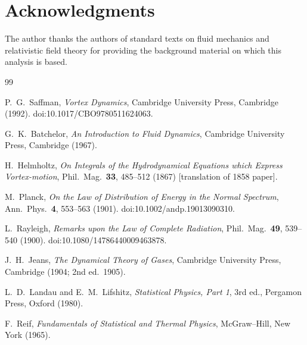 \documentclass[11pt]{article}
\begin{document}
    \section*{Acknowledgments}
        The author thanks the authors of standard texts on fluid mechanics and relativistic field theory for providing the background material on which this analysis is based.

        
        \begin{thebibliography}{99}

            P.~G.~Saffman,
            \newblock \emph{Vortex Dynamics},
            \newblock Cambridge University Press, Cambridge (1992).
            \newblock doi:10.1017/CBO9780511624063.

            G.~K.~Batchelor,
            \newblock \emph{An Introduction to Fluid Dynamics},
            \newblock Cambridge University Press, Cambridge (1967).

            H.~Helmholtz,
            \newblock \emph{On Integrals of the Hydrodynamical Equations which Express Vortex-motion},
            \newblock Phil.\ Mag.\ \textbf{33}, 485--512 (1867) [translation of 1858 paper].

            M.~Planck,
            \newblock \emph{On the Law of Distribution of Energy in the Normal Spectrum},
            \newblock Ann.\ Phys.\ \textbf{4}, 553--563 (1901).
            \newblock doi:10.1002/andp.19013090310.

            L.~Rayleigh,
            \newblock \emph{Remarks upon the Law of Complete Radiation},
            \newblock Phil.\ Mag.\ \textbf{49}, 539--540 (1900).
            \newblock doi:10.1080/14786440009463878.

            J.~H.~Jeans,
            \newblock \emph{The Dynamical Theory of Gases},
            \newblock Cambridge University Press, Cambridge (1904; 2nd ed.\ 1905).

            L.~D.~Landau and E.~M.~Lifshitz,
            \newblock \emph{Statistical Physics, Part 1},
            \newblock 3rd ed., Pergamon Press, Oxford (1980).

            F.~Reif,
            \newblock \emph{Fundamentals of Statistical and Thermal Physics},
            \newblock McGraw--Hill, New York (1965).


\end{thebibliography}
\end{document}
